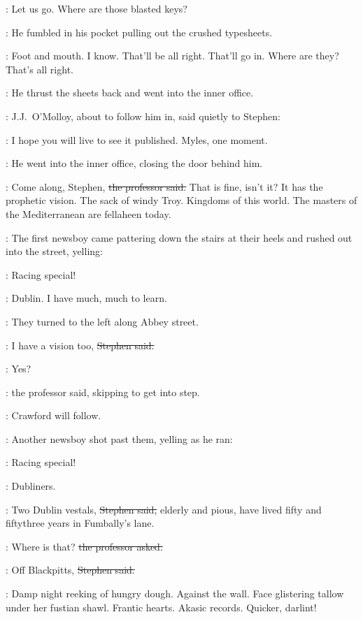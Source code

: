 \crawford:
Let us go.
Where are those blasted keys?

:
He fumbled in his pocket
pulling out the crushed typesheets.

\crawford:
Foot and mouth.
I know.
That'll be all right.
That'll go in.
Where are they?
That's all right.

:
He thrust the sheets back
and went into the inner office.



:
J.J.~O'Molloy,
about to follow him in,
said quietly to Stephen:

\jjom:
I hope you will live to see it published.
Myles, one moment.

:
He went into the inner office,
closing the door behind him.

\machugh:
Come along, Stephen,
\sout{the professor said.}
That is fine, isn't it?
It has the prophetic vision.
The sack of windy Troy.
Kingdoms of this world.
The masters of the Mediterranean are fellaheen today.

:
The first newsboy came pattering down the stairs at their heels
and rushed out into the street,
yelling:

\boy:
Racing special!

\StephenInt:
Dublin.
I have much, much to learn.

:
They turned to the left along Abbey street.

\Stephen:
I have a vision too,
\sout{Stephen said.}

\machugh:
Yes?

:
the professor said,
skipping to get into step.

\machugh:
Crawford will follow.

:
Another newsboy shot past them,
yelling as he ran:

\boy:
Racing special!



\StephenInt:
Dubliners.

\Stephen:
Two Dublin vestals,
\sout{Stephen said,}
elderly and pious,
have lived fifty and fiftythree years in Fumbally's lane.

\machugh:
Where is that?
\sout{the professor asked.}

\Stephen:
Off Blackpitts,
\sout{Stephen said.}

\StephenInt:
Damp night reeking of hungry dough.
Against the wall.
Face glistering tallow under her fustian shawl.
Frantic hearts.
Akasic records.
Quicker, darlint!

